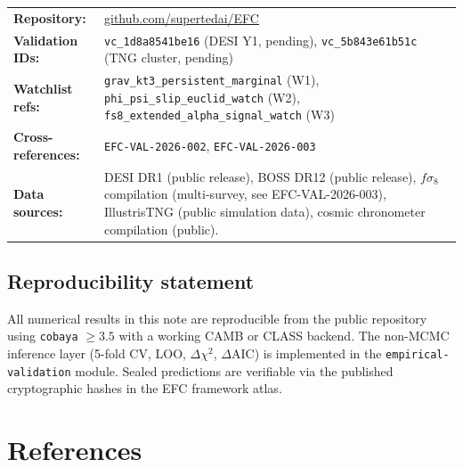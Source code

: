 \documentclass[11pt,a4paper]{article}
\begin{document}
\begin{tabularx}{\textwidth}{@{}lX@{}}
\textbf{Repository:} & \href{https://github.com/supertedai/EFC}{github.com/supertedai/EFC} \\
\textbf{Validation IDs:} & \texttt{vc\_1d8a8541be16} (DESI Y1, pending), \texttt{vc\_5b843e61b51c} (TNG cluster, pending) \\
\textbf{Watchlist refs:} & \texttt{grav\_kt3\_persistent\_marginal} (W1), \texttt{phi\_psi\_slip\_euclid\_watch} (W2), \texttt{fs8\_extended\_alpha\_signal\_watch} (W3) \\
\textbf{Cross-references:} & \texttt{EFC-VAL-2026-002}, \texttt{EFC-VAL-2026-003} \\
\textbf{Data sources:} & DESI DR1 (public release), BOSS DR12 (public release), $f\sigma_8$ compilation (multi-survey, see EFC-VAL-2026-003), IllustrisTNG (public simulation data), cosmic chronometer compilation (public). \\
\end{tabularx}

\subsection{Reproducibility statement}

All numerical results in this note are reproducible from the public repository using \texttt{cobaya} $\geq 3.5$ with a working CAMB or CLASS backend. The non-MCMC inference layer (5-fold CV, LOO, $\Delta\chi^2$, $\Delta\mathrm{AIC}$) is implemented in the \texttt{empirical-validation} module. Sealed predictions are verifiable via the published cryptographic hashes in the EFC framework atlas.

\section*{References}
\end{document}
